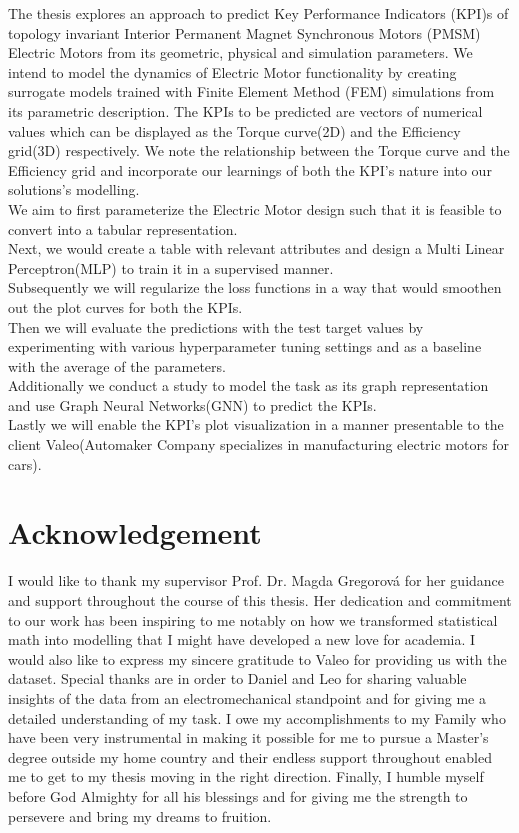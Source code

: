 \documentclass{report} %
\begin{document}
The thesis explores an approach to predict Key Performance Indicators (KPI)s of topology invariant Interior Permanent Magnet Synchronous Motors 
(PMSM) Electric Motors from its geometric, physical and simulation parameters.
We intend to model the dynamics of Electric Motor functionality by creating surrogate models trained with Finite Element Method (FEM) simulations from its parametric description.
The KPIs to be predicted are vectors of numerical values which can be displayed as the Torque curve(2D) and the Efficiency grid(3D) respectively.
We note the relationship between the Torque curve and the Efficiency grid and incorporate our learnings of both the KPI's nature into our solutions's modelling. \\
We aim to first parameterize the Electric Motor design such that it is feasible to convert into a tabular representation. \\
Next, we would create a table with relevant attributes and design a Multi Linear Perceptron(MLP) to train it in a supervised manner.\\
Subsequently we will regularize the loss functions in a way that would smoothen out the plot curves for both the KPIs. \\
Then we will evaluate the predictions with the test target values by experimenting with various hyperparameter tuning settings 
and as a baseline with the average of the parameters.\\
Additionally we conduct a study to model the task as its graph representation and use Graph Neural Networks(GNN) to predict the KPIs.\\
Lastly we will enable the KPI's plot visualization in a manner presentable to the client Valeo(Automaker Company specializes in manufacturing electric motors for cars).\\

\newpage 

\newpage 

\chapter*{Acknowledgement}
I would like to thank my supervisor Prof. Dr. Magda Gregorová for her guidance and support throughout the course of this thesis.
Her dedication and commitment to our work has been inspiring to me notably on how we transformed statistical math into modelling that I might have developed a 
new love for academia. I would also like to express my sincere gratitude to Valeo for providing us with the dataset.
Special thanks are in order to Daniel and Leo for sharing valuable insights of the data from an electromechanical standpoint and for giving me a detailed understanding 
of my task. I owe my accomplishments to my Family who have been very instrumental in making it possible for me to pursue a Master's degree outside my home country 
and their endless support throughout enabled me to get to my thesis moving in the right direction. Finally, I humble myself before God Almighty for all his blessings 
and for giving me the strength to persevere and bring my dreams to fruition.
\end{document}
